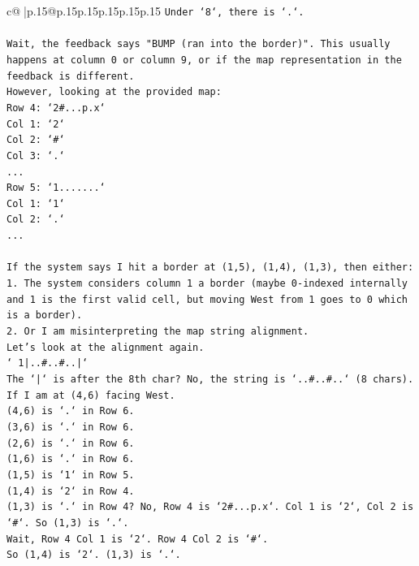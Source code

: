 \documentclass{article}
\begin{document}
{\begin{supertabular}{c@{$\;$}|p{.15\linewidth}@{}p{.15\linewidth}p{.15\linewidth}p{.15\linewidth}p{.15\linewidth}p{.15\linewidth}}
{{{\texttt{Under `8`, there is `.`.} \\
\\ 
\texttt{Wait, the feedback says "BUMP (ran into the border)". This usually happens at column 0 or column 9, or if the map representation in the feedback is different.} \\
\texttt{However, looking at the provided map:} \\
\texttt{Row 4: `2\#...p.x`} \\
\texttt{Col 1: `2`} \\
\texttt{Col 2: `\#`} \\
\texttt{Col 3: `.`} \\
\texttt{...} \\
\texttt{Row 5: `1.......`} \\
\texttt{Col 1: `1`} \\
\texttt{Col 2: `.`} \\
\texttt{...} \\
\\ 
\texttt{If the system says I hit a border at (1,5), (1,4), (1,3), then either:} \\
\texttt{1. The system considers column 1 a border (maybe 0{-}indexed internally and 1 is the first valid cell, but moving West from 1 goes to 0 which is a border).} \\
\texttt{2. Or I am misinterpreting the map string alignment.} \\
\texttt{Let's look at the alignment again.} \\
\texttt{` 1|..\#..\#..|`} \\
\texttt{The `|` is after the 8th char? No, the string is `..\#..\#..` (8 chars).} \\
\texttt{If I am at (4,6) facing West.} \\
\texttt{(4,6) is `.` in Row 6.} \\
\texttt{(3,6) is `.` in Row 6.} \\
\texttt{(2,6) is `.` in Row 6.} \\
\texttt{(1,6) is `.` in Row 6.} \\
\texttt{(1,5) is `1` in Row 5.} \\
\texttt{(1,4) is `2` in Row 4.} \\
\texttt{(1,3) is `.` in Row 4? No, Row 4 is `2\#...p.x`. Col 1 is `2`, Col 2 is `\#`. So (1,3) is `.`.} \\
\texttt{Wait, Row 4 Col 1 is `2`. Row 4 Col 2 is `\#`.} \\
\texttt{So (1,4) is `2`. (1,3) is `.`.} \\
}}}
\end{supertabular}}
\end{document}
